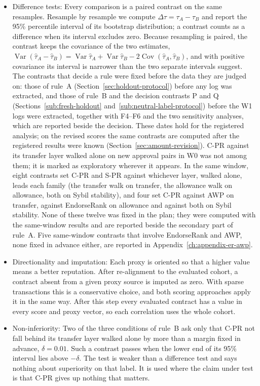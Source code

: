 \begin{itemize}
\item Difference tests: Every comparison is a paired contrast on the same resamples. Resample by resample we compute $\Delta\tau=\tau_A-\tau_B$ and report the 95\% percentile interval of its bootstrap distribution; a contrast counts as a difference when its interval excludes zero. Because resampling is paired, the contrast keeps the covariance of the two estimates, $\operatorname{Var}(\hat\tau_A-\hat\tau_B)=\operatorname{Var}\hat\tau_A+\operatorname{Var}\hat\tau_B-2\operatorname{Cov}(\hat\tau_A,\hat\tau_B)$, and with positive covariance its interval is narrower than the two separate intervals suggest. The contrasts that decide a rule were fixed before the data they are judged on: those of rule~A (Section~\ref{sec:holdout-protocol}) before any log was extracted, and those of rule~B and the decision contrasts P and Q (Sections~\ref{sub:fresh-holdout} and~\ref{sub:neutral-label-protocol}) before the W1 logs were extracted, together with F4--F6 and the two sensitivity analyses, which are reported beside the decision. These dates hold for the registered analysis; on the revised scores the same contrasts are computed after the registered results were known (Section~\ref{sec:amount-revision}). C-PR against its transfer layer walked alone on new approval pairs in W0 was not among them; it is marked as exploratory wherever it appears. In the same window, eight contrasts set C-PR and S-PR against whichever layer, walked alone, leads each family (the transfer walk on transfer, the allowance walk on allowance, both on Sybil stability), and four set C-PR against AWP on transfer, against EndorseRank on allowance and against both on Sybil stability. None of these twelve was fixed in the plan; they were computed with the same-window results and are reported beside the secondary part of rule~A. Five same-window contrasts that involve EndorseRank and AWP, none fixed in advance either, are reported in Appendix~\ref{ch:appendix-er-awp}.

\item Directionality and imputation: Each proxy is oriented so that a higher value means a better reputation. After re-alignment to the evaluated cohort, a contract absent from a given proxy source is imputed as zero. With sparse transactions this is a conservative choice, and both scoring approaches apply it in the same way. After this step every evaluated contract has a value in every score and proxy vector, so each correlation uses the whole cohort.

\item Non-inferiority: Two of the three conditions of rule~B ask only that C-PR not fall behind its transfer layer walked alone by more than a margin fixed in advance, $\delta=0.01$. Such a contrast passes when the lower end of its 95\% interval lies above $-\delta$. The test is weaker than a difference test and says nothing about superiority on that label. It is used where the claim under test is that C-PR gives up nothing that matters.


\end{itemize}
